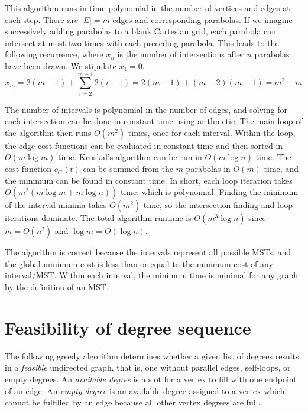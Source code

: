 \documentclass[12pt]{article}
\begin{document}
This algorithm runs in time polynomial in the number of vertices and
edges at each step. There are $|E| = m$ edges and corresponding parabolas.
If we imagine successively adding parabolas to a blank Cartesian grid,
each parabola can intersect at most two times with each preceding
parabola. This leads to the following recurrence, where $x_n$ is the
number of intersections after $n$ parabolas have been drawn.
We stipulate $x_1 = 0$.
\begin{displaymath}
x_m = 2(m-1) + \sum_{i=2}^{m-1}{2(i-1)} = 2(m-1) + (m-2)(m-1) = m^2 -m
\end{displaymath}

The number of intervals is polynomial in the number of edges, and solving
for each intersection can be done in constant time using arithmetic.
The main loop of the algorithm then runs $O(m^2)$ times, once for each
interval. Within the loop, the edge cost functions can be evaluated in
constant time and then sorted in $O(m\log{m})$ time.
Kruskal's algorithm can be run in $O(m\log{n})$ time.
The cost function $c_G(t)$ can be summed from the $m$ parabolas in
$O(m)$ time, and the minimum can be found in constant time.
In short, each loop iteration takes $O(m^2(m\log{m}+m\log{n}))$ time, which
is polynomial.
Finding the minimum of the interval minima takes $O(m^2)$ time, so the
intersection-finding and loop iterations dominate. The total algorithm
runtime is $O(m^3\log{n})$ since $m = O(n^2)$ and $\log{m} = O(\log{n})$.

The algorithm is correct because the intervals represent all possible
MSTs, and the global minimum cost is less than or equal to the minimum cost
of
any interval/MST. Within each interval, the minimum time is minimal for
any graph by the definition of an MST.

\section{Feasibility of degree sequence}

The following greedy algorithm determines whether a given list of degrees
results in a \textit{feasible} undirected graph, that is, one without
parallel edges, self-loops, or empty degrees.
An \textit{available degree} is a slot for a vertex to fill with one endpoint
of an edge.
An \textit{empty degree} is an available degree assigned to a vertex which
cannot be fulfilled by an edge because all other vertex degrees are full.
\end{document}
